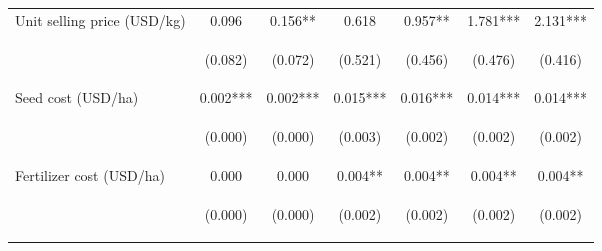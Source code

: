 \begin{center}
\begin{tabular}{lcccccc}
Unit selling price (USD/kg) & 0.096 & 0.156** & 0.618 & 0.957** & 1.781*** & 2.131*** \\
\vspace{4pt} & \begin{footnotesize}(0.082)\end{footnotesize} & \begin{footnotesize}(0.072)\end{footnotesize} & \begin{footnotesize}(0.521)\end{footnotesize} & \begin{footnotesize}(0.456)\end{footnotesize} & \begin{footnotesize}(0.476)\end{footnotesize} & \begin{footnotesize}(0.416)\end{footnotesize} \\
Seed cost (USD/ha) & 0.002*** & 0.002*** & 0.015*** & 0.016*** & 0.014*** & 0.014*** \\
\vspace{4pt} & \begin{footnotesize}(0.000)\end{footnotesize} & \begin{footnotesize}(0.000)\end{footnotesize} & \begin{footnotesize}(0.003)\end{footnotesize} & \begin{footnotesize}(0.002)\end{footnotesize} & \begin{footnotesize}(0.002)\end{footnotesize} & \begin{footnotesize}(0.002)\end{footnotesize} \\
Fertilizer cost (USD/ha) & 0.000 & 0.000 & 0.004** & 0.004** & 0.004** & 0.004** \\
\vspace{4pt} & \begin{footnotesize}(0.000)\end{footnotesize} & \begin{footnotesize}(0.000)\end{footnotesize} & \begin{footnotesize}(0.002)\end{footnotesize} & \begin{footnotesize}(0.002)\end{footnotesize} & \begin{footnotesize}(0.002)\end{footnotesize} & \begin{footnotesize}(0.002)\end{footnotesize} \\

\end{tabular}
\end{center}
